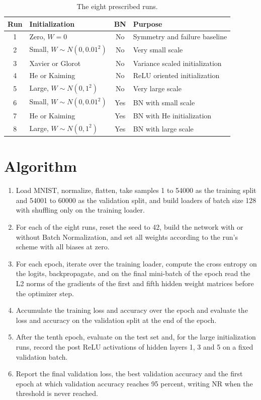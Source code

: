 \documentclass[12pt]{article}
\begin{document}
\begin{table}[H]
\centering
\begin{tabular}{clcl}
\toprule
Run & Initialization & BN & Purpose \\
\midrule
1 & Zero, $W = 0$ & No & Symmetry and failure baseline \\
2 & Small, $W \sim N(0, 0.01^2)$ & No & Very small scale \\
3 & Xavier or Glorot & No & Variance scaled initialization \\
4 & He or Kaiming & No & ReLU oriented initialization \\
5 & Large, $W \sim N(0, 1^2)$ & No & Very large scale \\
6 & Small, $W \sim N(0, 0.01^2)$ & Yes & BN with small scale \\
7 & He or Kaiming & Yes & BN with He initialization \\
8 & Large, $W \sim N(0, 1^2)$ & Yes & BN with large scale \\
\bottomrule
\end{tabular}
\caption{The eight prescribed runs.}
\end{table}

\section{Algorithm}

\begin{enumerate}
\item Load MNIST, normalize, flatten, take samples 1 to 54000 as the training split and 54001 to 60000 as the validation split, and build loaders of batch size 128 with shuffling only on the training loader.
\item For each of the eight runs, reset the seed to 42, build the network with or without Batch Normalization, and set all weights according to the run's scheme with all biases at zero.
\item For each epoch, iterate over the training loader, compute the cross entropy on the logits, backpropagate, and on the final mini-batch of the epoch read the L2 norms of the gradients of the first and fifth hidden weight matrices before the optimizer step.
\item Accumulate the training loss and accuracy over the epoch and evaluate the loss and accuracy on the validation split at the end of the epoch.
\item After the tenth epoch, evaluate on the test set and, for the large initialization runs, record the post ReLU activations of hidden layers 1, 3 and 5 on a fixed validation batch.
\item Report the final validation loss, the best validation accuracy and the first epoch at which validation accuracy reaches 95 percent, writing NR when the threshold is never reached.
\end{enumerate}
\end{document}
